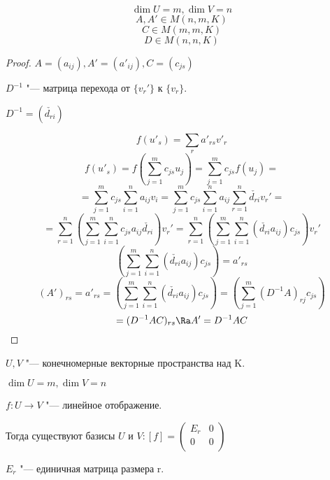 \begin{Rem}
$$\dim U = m, \dim V = n$$
$$A, A' \in M(n, m, K)$$
$$C \in M(m, m, K)$$
$$D \in M(n, n, K)$$
\end{Rem}
\begin{proof}
$A = (a_{ij}), A'=(a'_{ij}), C = (c_{js})$

$D^{-1}$ "--- матрица перехода от $\{v_{r}'\}$ к $\{v_r\}$.

$D^{-1}=(\check{d_{ri}})$

$$f(u'_{s}) = \sum_{r}a'_{rs}v'_r$$
$$f(u'_s) = f(\sum_{j = 1}^{m}c_{js}u_j) = \sum_{j = 1}^{m}c_{js}f(u_j) = $$
$$=\sum_{j = 1}^{m}c_{js}\sum_{i = 1}^{n}a_{ij}v_i = \sum_{j = 1}^{m}c_{js}\sum_{i = 1}^{n}a_{ij}\sum_{r = 1}^{n}\check{d_{ri}} v_r' =$$
$$=\sum_{r = 1}^{n}(\sum_{j = 1}^{m}\sum_{i = 1}^{n}c_{js}a_{ij}\check{d_{ri}})v_{r}'
=\sum_{r = 1}^{n}(\sum_{j = 1}^{m}\sum_{i = 1}^{n}(\check{d_{ri}}a_{ij})c_{js})v_{r}' $$
$$ (\sum_{j = 1}^{m}\sum_{i = 1}^{n}(\check{d_{ri}}a_{ij})c_{js}) = a'_{rs}$$
$$(A')_{rs} = a'_{rs} = (\sum_{j = 1}^{m}\sum_{i = 1}^{n}(\check{d_{ri}}a_{ij})c_{js}) = 
(\sum_{j = 1}^{m}(D^{-1}A)_{rj}c_{js})$$
$$ = (D^{-1}AC)_{rs} \Ra A' = D^{-1}AC$$
\end{proof}

\begin{theorem}
$U, V$ "--- конечномерные векторные пространства над K.

$\dim U = m, \dim V = n$

$f: U \to V$ "--- линейное отображение.

Тогда существуют базисы $U$ и $V\colon [f] = 
\begin{pmatrix}
E_r&0\\
0&0\\
\end{pmatrix}$

$E_r$ "--- единичная матрица размера r.
\end{theorem}

